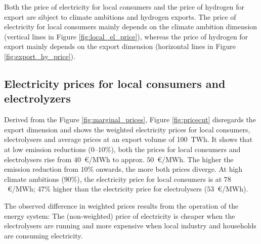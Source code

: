 Both the price of electricity for local consumers and the price of hydrogen for export are sibject to climate ambitions and hydrogen exports. The price of electricity for local consumers mainly depends on the climate ambition dimension (vertical lines in Figure \ref{fig:local_el_price}), whereas the price of hydrogen for export mainly depends on the export dimension (horizontal lines in Figure \ref{fig:export_hy_price}).



\subsection{Electricity prices for local consumers and electrolyzers}
\label{subsec:economic_benefits}
Derived from the Figure \ref{fig:marginal_prices}, Figure \ref{fig:pricecut} disregards the export dimension and shows the weighted electricity prices for local consumers, electrolysers and average prices at an export volume of 100~TWh. It shows that at low emission reductions ($0$--$10$\%), both the prices for local consumers and electrolysers rise from $40$~\euro/MWh to approx. $50$~\euro/MWh. The higher the emission reduction from $10$\% onwards, the more both prices diverge. At high climate ambitions ($90$\%), the electricity price for local consumers is at $78$~\euro/MWh; $47$\% higher than the electricity price for electrolysers ($53$~\euro/MWh).

The observed difference in weighted prices results from the operation of the energy system: The (non-weighted) price of electricity is cheaper when the electrolysers are running and more expensive when local industry and households are consuming electricity.

